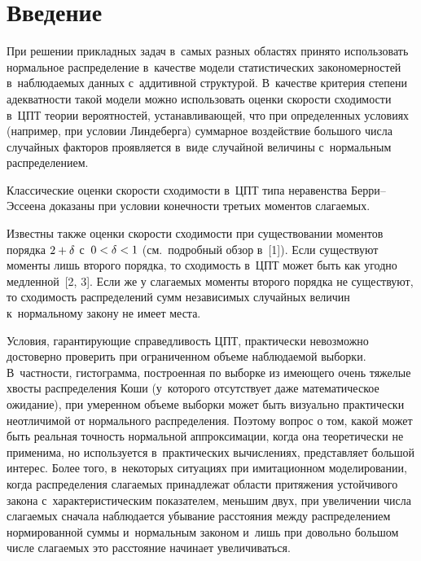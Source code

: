 \begin{multicols}{2}

\label{st\stat}

\section{Введение}


При решении прикладных задач в~самых разных областях принято использовать нормальное 
распределение в~качестве модели статистических закономерностей в~наблюдаемых данных с~аддитивной структурой. 
В~качестве критерия степени адекватности такой модели можно использовать оценки ско\-рости 
сходимости в~ЦПТ тео\-рии вероятностей, устанавливающей, 
что при определенных условиях (например, при условии Линдеберга) суммарное воздействие 
большого числа случайных факторов проявляется в~виде случайной величины с~нормальным распределением. 

Классические оценки скорости сходимости в~ЦПТ типа неравенства Бер\-ри--Эс\-се\-ена доказаны при 
условии конечности третьих моментов сла\-га\-емых. 

Известны также оценки ско\-рости сходимости при 
существовании моментов порядка $2\hm+\delta$ с~$0\hm<\delta\hm<1$ (см.\ подробный обзор в~[1]).
 Если существуют моменты лишь второго порядка, то сходимость в~ЦПТ может быть как угодно медленной~[2, 3]. 
 Если же у слагаемых моменты второго порядка не существуют, то сходимость распределений 
 сумм независимых случайных величин к~нормальному закону не имеет места. 
 
 Условия, 
 гарантирующие справедливость ЦПТ, практически 
 невозможно достоверно проверить при ограниченном объеме наблюдаемой выборки. 
 В~част\-ности, гистограмма, построенная по выборке из имеющего очень тяжелые хвосты 
 распределения Коши (у~которого отсутствует даже математическое ожидание), при умеренном 
 объеме выборки может быть визуально практически неотличимой от нормального распределения. 
 Поэтому вопрос о том, какой может быть реальная точность нормальной аппроксимации, когда 
 она теоретически не применима, но используется в~практических вычислениях, представляет 
 большой интерес. Более того, в~некоторых ситуациях при имитационном моделировании, 
 когда распределения слагаемых принадлежат области притяжения устойчивого закона с~характеристическим 
 показателем, меньшим двух, при увеличении числа слагаемых сначала наблюдается убывание 
 расстояния между распределением нормированной суммы и~нормальным законом и~лишь при довольно 
 большом числе слагаемых это расстояние начинает увеличиваться. 
 

\end{multicols}
